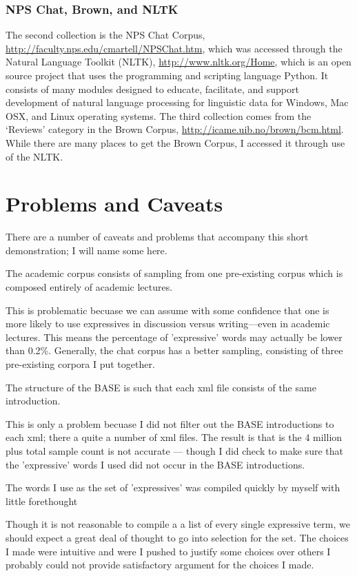 \documentclass{article}
\begin{document}
\subsubsection{NPS Chat, Brown, and NLTK}
The second collection is the NPS Chat Corpus, \url{http://faculty.nps.edu/cmartell/NPSChat.htm}, which was accessed through the Natural Language Toolkit (NLTK), \url{http://www.nltk.org/Home}, which is an open source project that uses the programming and scripting language Python. It consists of many modules designed to educate, facilitate, and support development of natural language processing for linguistic data for Windows, Mac OSX, and Linux operating systems.
The third collection comes from the `Reviews' category in the Brown Corpus, \url{http://icame.uib.no/brown/bcm.html}. While there are many places to get the Brown Corpus, I accessed it through use of the NLTK. 

\section{Problems and Caveats}\label{problem}
There are a number of caveats and problems that accompany this short demonstration; I will name some here.

\begin{problem} The academic corpus consists of sampling from one pre-existing corpus which is composed entirely of academic lectures. 
\end{problem}
This is problematic becuase we can assume with some confidence that one is more likely to use expressives in discussion versus writing---even in academic lectures. This means the percentage of 'expressive' words may actually be lower than 0.2\%. Generally, the chat corpus has a better sampling, consisting of three pre-existing corpora I put together.

\begin{problem}\label{base}
    The structure of the BASE is such that each xml file consists of the same introduction.
\end{problem}
This is only a problem becuase I did not filter out the BASE introductions to each xml; there a quite a number of xml files. The result is that is the 4 million plus total sample count is not accurate --- though I did check to make sure that the 'expressive' words I used did not occur in the BASE introductions.

\begin{problem}
    The words I use as the set of 'expressives' was compiled quickly by myself with little forethought
\end{problem}
Though it is not reasonable to compile a a list of every single expressive term, we should expect a great deal of thought to go into selection for the set. The choices I made were intuitive and were I pushed to justify some choices over others I probably could not provide satisfactory argument for the choices I made.
\end{document}
